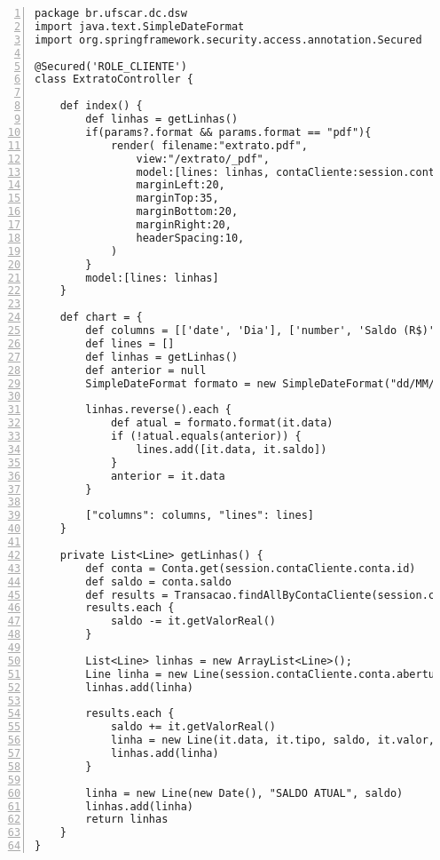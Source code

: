 \begin{lstlisting}[caption=  Controlador  {\bf  ExtratoController},  frame=trBL,
    float=htbp, label=codExtratoController, numbers=left] 
package br.ufscar.dc.dsw
import java.text.SimpleDateFormat
import org.springframework.security.access.annotation.Secured

@Secured('ROLE_CLIENTE')
class ExtratoController { 

    def index() {
        def linhas = getLinhas()
        if(params?.format && params.format == "pdf"){
            render( filename:"extrato.pdf",
                view:"/extrato/_pdf",
                model:[lines: linhas, contaCliente:session.contaCliente],
                marginLeft:20,
                marginTop:35,
                marginBottom:20,
                marginRight:20,
                headerSpacing:10,
            )   
        }
        model:[lines: linhas]
    }
    
    def chart = {
        def columns = [['date', 'Dia'], ['number', 'Saldo (R$)']]
        def lines = []
        def linhas = getLinhas()
        def anterior = null
        SimpleDateFormat formato = new SimpleDateFormat("dd/MM/yyyy")

        linhas.reverse().each {
            def atual = formato.format(it.data)
            if (!atual.equals(anterior)) {
                lines.add([it.data, it.saldo])                
            }
            anterior = it.data
        }
          
        ["columns": columns, "lines": lines]
    }

    private List<Line> getLinhas() {
        def conta = Conta.get(session.contaCliente.conta.id)
        def saldo = conta.saldo
        def results = Transacao.findAllByContaCliente(session.contaCliente, [sort:"data"])
        results.each {
            saldo -= it.getValorReal()
        }

        List<Line> linhas = new ArrayList<Line>();
        Line linha = new Line(session.contaCliente.conta.abertura, "ABERTURA", saldo)
        linhas.add(linha)       

        results.each {
            saldo += it.getValorReal()
            linha = new Line(it.data, it.tipo, saldo, it.valor, it.motivo)
            linhas.add(linha)
        }

        linha = new Line(new Date(), "SALDO ATUAL", saldo)
        linhas.add(linha)
        return linhas
    }
}
\end{lstlisting} 

